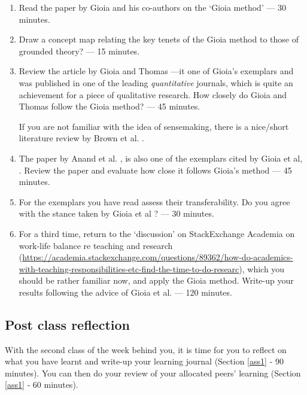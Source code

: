 \documentclass[]{book}
\theoremstyle{definition}
\theoremstyle{definition}
\theoremstyle{definition}
\theoremstyle{remark}
\begin{document}
\begin{enumerate}
\def\labelenumi{\arabic{enumi}.}
\item
  Read the paper by Gioia and his co-authors on the `Gioia method'
  \autocite{gioia_2013_seekingqualitativerigor} --- 30 minutes.
\item
  Draw a concept map relating the key tenets of the Gioia method to
  those of grounded theory? --- 15 minutes.
\item
  Review the article by Gioia and Thomas
  \autocite*{gioia_1996_identityimageissuea}---it one of Gioia's
  exemplars and was published in one of the leading \emph{quantitative}
  journals, which is quite an achievement for a piece of qualitative
  research. How closely do Gioia and Thomas follow the Gioia method? ---
  45 minutes.

  If you are not familiar with the idea of sensemaking, there is a
  nice/short literature review by Brown et al.
  \autocite{brown_2015_makingsensesensemaking}.
\item
  The paper by Anand et al.
  \autocite{anand_2007_knowledgebasedinnovationemergence}, is also one
  of the exemplars cited by Gioia et al,
  \autocite*{gioia_2013_seekingqualitativerigor}. Review the paper and
  evaluate how close it follows Gioia's method --- 45 minutes.
\item
  For the exemplars you have read assess their transferability. Do you
  agree with the stance taken by Gioia et al
  \autocite*{gioia_2013_seekingqualitativerigor}? --- 30 minutes.
\item
  For a third time, return to the `discussion' on StackExchange Academia
  on work-life balance re teaching and research
  (\url{https://academia.stackexchange.com/questions/89362/how-do-academics-with-teaching-responsibilities-etc-find-the-time-to-do-researc}),
  which you should be rather familiar now, and apply the Gioia method.
  Write-up your results following the advice of Gioia et al.
  \autocite*{gioia_2013_seekingqualitativerigor} --- 120 minutes.
\end{enumerate}

\hypertarget{post-class-reflection-9}{%
\subsection*{Post class reflection}\label{post-class-reflection-9}}

With the second class of the week behind you, it is time for you to
reflect on what you have learnt and write-up your learning journal
(Section \ref{ass1} ‐ 90 minutes). You can then do your review of your
allocated peers' learning (Section \ref{ass1} ‐ 60 minutes).
\end{document}

